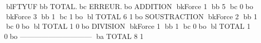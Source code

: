 blFTYUFbb           TOTAL.bc      ERREUR.bo
ADDITION
bkForce      1     bb  5	bc        0bo
bkForce      3     bb  1	bc        1bo
bl TOTAL             6	        1bo
SOUSTRACTION
bkForce      2     bb  1	bc        0bo
bl TOTAL             1	        0bo
DIVISION
bkForce      1     bb  1	bc        0bo
bl TOTAL             1	        0bo
------------------------------
ba TOTAL             8	        1
